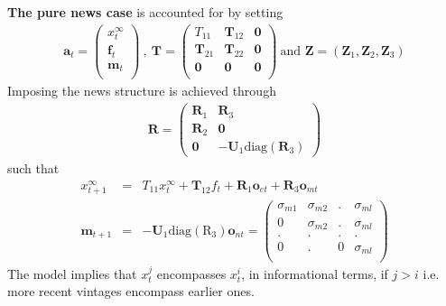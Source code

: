 \documentclass[11pt]{article}
\begin{document}
\textbf{The pure news case} is accounted for by setting
\begin{eqnarray*}
\textbf{a}_t=\left(
               \begin{array}{c}
                 x_t^\infty \\
                 \textbf{f}_t \\
                 \textbf{m}_t \\
               \end{array}
             \right)~,~\textbf{T}=\left(
                                    \begin{array}{ccc}
                                      T_{11} & \textbf{T}_{12} & \textbf{0} \\
                                      \textbf{T}_{21} & \textbf{T}_{22} & \textbf{0} \\
                                      \textbf{0} & \textbf{0} & \textbf{0} \\
                                    \end{array}
                                  \right) ~\textrm{and~} \textbf{Z}=(\textbf{Z}_1,\textbf{Z}_2,\textbf{Z}_3)
\end{eqnarray*}
Imposing the news structure is achieved through
\begin{eqnarray*}
\textbf{R}=\left(
             \begin{array}{cc}
               \textbf{R}_{1} & \textbf{R}_{3}   \\
               \textbf{R}_{2} &  \textbf{0}  \\
               \textbf{0} &  -\textbf{U}_1\textrm{diag}(\textbf{R}_3)
             \end{array}
           \right)
\end{eqnarray*}
such that
\begin{eqnarray*}
x_{t+1}^\infty&=&T_{11}x_t^\infty+\textbf{T}_{12}f_t+\textbf{R}_1\textbf{o}_{et}+\textbf{R}_3\textbf{o}_{mt}\\
\textbf{m}_{t+1}&=&-\textbf{U}_1\textrm{diag}(\textrm{R}_3)\textbf{o}_{nt}=
\left(
  \begin{array}{cccc}
    \sigma_{m1} & \sigma_{m2} & . & \sigma_{ml} \\
    0 & \sigma_{m2} & . & \sigma_{ml} \\
    . & . & . & . \\
    0 & . & 0 & \sigma_{ml} \\
  \end{array}
\right)
\end{eqnarray*}
The model implies that $x_t^{j}$ encompasses $x_t^i$, in informational terms, if $j>i$ i.e. more recent vintages encompass earlier ones. \\
\end{document}
